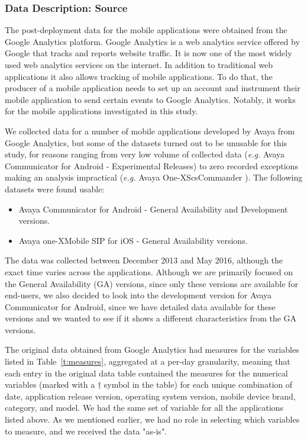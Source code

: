 \documentclass[smallcondensed]{svjour3}     %
\begin{document}
\subsubsection{Data Description: Source}
The post-deployment data for the mobile applications were obtained from the 
Google Analytics platform.
Google Analytics is a web analytics service offered by
Google that tracks and reports website traffic. It is now one of the most
widely used web analytics services on the internet. In addition to
traditional web applications it also allows tracking of mobile
applications. To do that, the producer of a mobile application needs
to set up an account and instrument their mobile application to send certain
events to Google Analytics. Notably, it works for the mobile
applications investigated in this study. 

We collected data for a number of mobile applications developed by Avaya from Google Analytics, but some of the datasets turned out to be unusable for this study, for reasons ranging from very low volume of collected data (\textit{e.g.} Avaya Communicator for Android - Experimental Releases) to zero recorded exceptions making an analysis impractical (\textit{e.g.} Avaya One-X\textregistered   ScsCommander ). The following datasets were found usable:
\begin{itemize}
    \item Avaya Communicator for Android - General Availability and Development versions.
    \item Avaya one-X\textregistered Mobile  SIP for  iOS - General Availability versions.
\end{itemize}

The data was collected between December 2013 and May 2016, although the exact time varies across the applications. Although we are primarily focused on the General Availability (GA) versions, since only these versions are available for end-users, we also decided to look into the development version for Avaya Communicator for Android, since we have detailed data available for these versions and we wanted to see if it shows a different characteristics from the GA versions.  

The original data obtained from Google Analytics had measures for the variables 
listed in Table~\ref{t:measures}, aggregated at a per-day granularity, meaning 
that each entry in the original data table contained the measures for the numerical 
variables (marked with a $\dagger$ symbol in the table) for each unique combination
of date, application release version, operating system version, mobile device brand, 
category, and model. We had the same set of variable for all the applications listed above.
As we mentioned earlier, we had no role in selecting which variables to measure, and we received the data "as-is".
\end{document}
